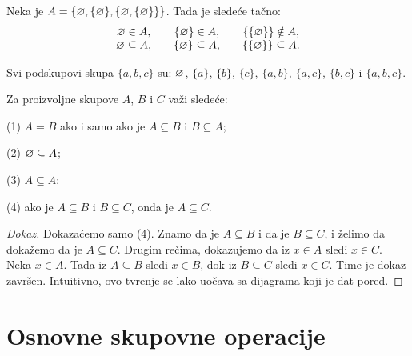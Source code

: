\begin{EX}
  Neka je $A = \{\varnothing, \{\varnothing\}, \{\varnothing, \{\varnothing\}\}\}$. Tada je slede\'ce ta\v cno:
  $$
    \begin{array}{c@{\qquad}c@{\qquad}c}
      \0 \in A,        & \{\0\} \in A,        & \{\{\0\}\} \notin A,\\
      \0 \subseteq A,  & \{\0\} \subseteq A,  & \{\{\0\}\} \subseteq A.
    \end{array}
  $$
\end{EX}

\begin{EX}
  Svi podskupovi skupa $\{a, b, c\}$ su: $\varnothing$, $\{a\}$, $\{b\}$, $\{c\}$, $\{a, b\}$, $\{a, c\}$, $\{b, c\}$ i $\{a, b, c\}$.
\end{EX}

\begin{THM}
  Za proizvoljne skupove $A$, $B$ i $C$ va\v zi slede\'ce:
  
  (1) $A = B$ ako i samo ako je $A \subseteq B$ i $B \subseteq A$;

  (2) $\varnothing \subseteq A$;
  
  (3) $A \subseteq A$;
  
  (4) ako je $A \subseteq B$ i $B \subseteq C$, onda je $A \subseteq C$.
\end{THM}

\medskip

\noindent
\begin{minipage}{3in}
  \begin{proof}[Dokaz]
    Dokaza\'cemo samo (4). Znamo da je $A \subseteq B$ i da je $B \subseteq C$, i \v zelimo da doka\v zemo da je $A \subseteq C$.
    Drugim re\v cima, dokazujemo da iz $x \in A$ sledi $x \in C$.
    Neka $x \in A$. Tada iz $A \subseteq B$ sledi $x \in B$, dok iz $B \subseteq C$ sledi $x \in C$. Time je dokaz zavr\v sen.
    Intuitivno, ovo tvr\dj enje se lako uo\v cava sa dijagrama koji je dat pored.
  \end{proof}
\end{minipage}
\hfill
\begin{minipage}{2.5in}
  \begin{center}
    
  \end{center}
\end{minipage}

\section{Osnovne skupovne operacije}

